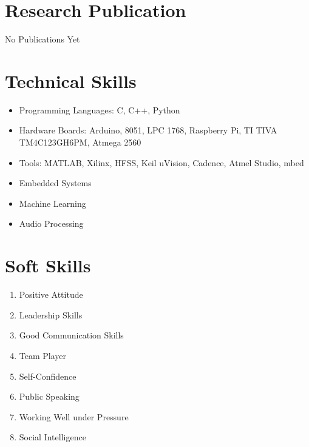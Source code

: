 \documentclass[12pt,a4paper,sans]{moderncv} %
\begin{document}

\section{Research Publication}

No Publications Yet


\section{Technical Skills}

\begin{itemize}
	\item Programming Languages: C, C++, Python
	\item Hardware Boards: Arduino, 8051, LPC 1768, Raspberry Pi, TI TIVA TM4C123GH6PM, Atmega 2560
	\item Tools: MATLAB, Xilinx, HFSS, Keil uVision, Cadence, Atmel Studio, mbed 
	\item Embedded Systems
	\item Machine Learning
	\item Audio Processing
	
\end{itemize}


\section{Soft Skills}

\begin{enumerate}
	\item Positive Attitude
	\item Leadership Skills
	\item Good Communication Skills
	\item Team Player
	\item Self-Confidence
	\item Public Speaking
	\item Working Well under Pressure
	\item Social Intelligence
	
\end{enumerate}
\end{document}
